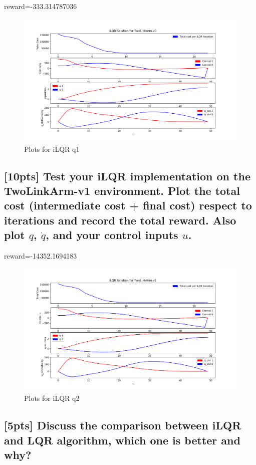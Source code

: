\documentclass{article}
\begin{document}
reward=-333.314787036

\begin{figure}[H] \label{fig:ilqr_qn1}
  \centering
  \includegraphics[width=1.2\textwidth]{images/ilqr_qn1}
  \caption{Plots for iLQR q1}
\end{figure}

\subsection{[10pts] Test your iLQR implementation on the TwoLinkArm-v1 environment. Plot the total cost (intermediate cost + final cost) respect to iterations and record the total reward. Also plot $q$, $\dot{q}$, and your control inputs $u$.}

reward=-14352.1694183

\begin{figure}[H] \label{fig:ilqr_qn2}
  \centering
  \includegraphics[width=1.2\textwidth]{images/ilqr_qn2}
  \caption{Plots for iLQR q2}
\end{figure}

\subsection{[5pts] Discuss the comparison between iLQR and LQR algorithm, which one is better and why?}
\end{document}
